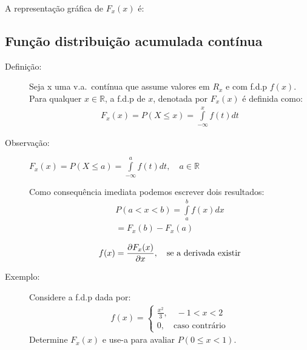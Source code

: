 \begin{description}
       A representação gráfica de $F_x(x)$ é: 
       \begin{figure}[H]
         \centering
         
         \caption{}
         \label{fig:}
       \end{figure}
   \end{description}
   \subsection{Função distribuição acumulada contínua}
   \begin{description}
     \item [Definição:] Seja x uma v.a.\ contínua que assume valores em $R_{x}$ e com 
       f.d.p $f(x)$. Para qualquer $x \in \mathbb{R}$, a f.d.p de $x$, denotada por 
       $F_{x}(x)$ é definida como: 
       \begin{align}
         F_{x}(x)= P(X \leq x)= \int \limits_{-\infty}^{x} f(t)dt 
       \end{align}
     \item [Observação:] $F_{x}(x)= P(X \leq a)= \int \limits_{-\infty}^{a}f(t)dt  , \quad a \in \mathbb{R}$

       Como consequência imediata podemos escrever dois resultados: 
       \begin{align}
         P(a <x<b)= \int \limits_{a}^{b} f(x)dx\\
         = F_{x}(b)-F_{x}(a)
       \end{align}

       \begin{align}
         f(x)=\frac{\partial F_{x}(x)}{\partial x}, \text{\quad se a derivada existir}
       \end{align}

     \item [ Exemplo: ] Considere a f.d.p dada por: 
       \begin{align*}
         f(x)= 
         \begin{cases}
           \frac{x^2}{3},\quad  -1 < x < 2 \\
           0, \quad \text{caso contrário}
         \end{cases}
       \end{align*}
       Determine $F_{x}(x)$ e use-a para avaliar $P(0 \le x< 1)$.


\end{description}
